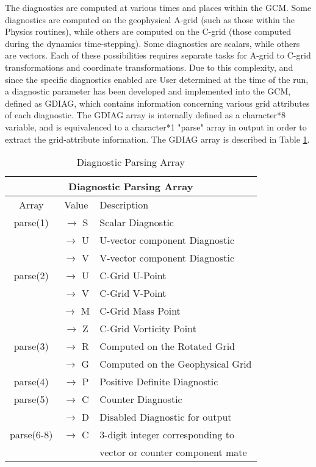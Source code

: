 The diagnostics are computed at various times and places within the GCM.  
Some diagnostics are computed on the geophysical A-grid (such as 
those within the Physics routines), while others are computed on the C-grid 
(those computed during the dynamics time-stepping).  Some diagnostics are 
scalars, while others are vectors.  Each of these possibilities requires
separate tasks for A-grid to C-grid transformations and coordinate transformations.  Due
to this complexity, and since the specific diagnostics enabled are User determined at the
time of the run, 
a diagnostic parameter has been developed and implemented into the GCM, defined as GDIAG,
which contains information concerning various grid attributes of each diagnostic.  The GDIAG
array is internally defined as a character*8 variable, and is equivalenced to 
a character*1 "parse" array in output in order to extract the grid-attribute information.
The GDIAG array is described in Table \ref{tab:diagnostics:gdiag.tabl}.

\begin{table}
\caption{Diagnostic Parsing Array}
\label{tab:diagnostics:gdiag.tabl}
\begin{center}
\begin{tabular}{ |c|c|l| }
\hline
\multicolumn{3}{|c|}{\bf Diagnostic Parsing Array} \\ 
\hline
\hline
Array & Value & Description \\
\hline
  parse(1)   & $\rightarrow$ S &  Scalar Diagnostic                 \\ 
             & $\rightarrow$ U &  U-vector component Diagnostic     \\ 
             & $\rightarrow$ V &  V-vector component Diagnostic     \\ \hline
  parse(2)   & $\rightarrow$ U &  C-Grid U-Point                    \\ 
             & $\rightarrow$ V &  C-Grid V-Point                    \\ 
             & $\rightarrow$ M &  C-Grid Mass Point                 \\ 
             & $\rightarrow$ Z &  C-Grid Vorticity Point            \\ \hline
  parse(3)   & $\rightarrow$ R &  Computed on the Rotated Grid      \\ 
             & $\rightarrow$ G &  Computed on the Geophysical Grid  \\ \hline
  parse(4)   & $\rightarrow$ P &  Positive Definite Diagnostic      \\ \hline
  parse(5)   & $\rightarrow$ C &  Counter Diagnostic                \\
             & $\rightarrow$ D &  Disabled Diagnostic for output    \\ \hline
  parse(6-8) & $\rightarrow$ C &  3-digit integer corresponding to  \\
             &                 &  vector or counter component mate  \\ \hline
\end{tabular}
\end{center}
\end{table}

